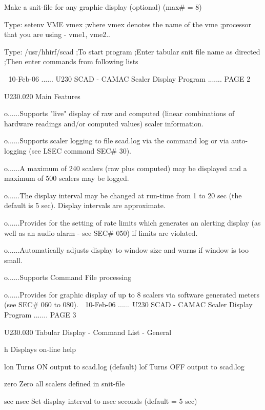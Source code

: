    Make a snit-file for any graphic display (optional) (max# = 8)
 
   Type: setenv VME vmex   ;where vmex denotes the name of the vme
                           ;processor that you are using - vme1, vme2..
 
   Type: /usr/hhirf/scad   ;To start program
                           ;Enter tabular snit file name as directed
                           ;Then enter commands from following lists
 
    
   10-Feb-06 ...... U230  SCAD - CAMAC Scaler Display Program ....... PAGE   2
 
 
   U230.020  Main Features
 
   o......Supports  "live" display of raw and computed (linear combinations of
          hardware readings and/or computed values) scaler information.
 
   o......Supports scaler logging to file scad.log via the command log or  via
          auto-logging (see LSEC command SEC# 30).
 
   o......A  maximum of 240 scalers (raw plus computed) may be displayed and a
          maximum of 500 scalers may be logged.
 
   o......The display interval may be changed at run-time from  1  to  20  sec
          (the default is 5 sec). Display intervals are approximate.
 
   o......Provides  for the setting of rate limits which generates an alerting
          display (as well as an audio alarm - see SEC#  050)  if  limits  are
          violated.
 
   o......Automatically  adjusts display to window size and warns if window is
          too small.
 
   o......Supports Command File processing
 
   o......Provides for graphic  display  of  up  to  8  scalers  via  software
          generated meters (see SEC# 060 to 080).
    
   10-Feb-06 ...... U230  SCAD - CAMAC Scaler Display Program ....... PAGE   3
 
 
   U230.030  Tabular Display - Command List - General
 
   h               Displays on-line help
 
   lon             Turns ON  output to scad.log  (default)
   lof             Turns OFF output to scad.log
 
   zero            Zero all scalers defined in snit-file
 
   sec  nsec       Set display interval to nsec seconds (default = 5 sec)
 
